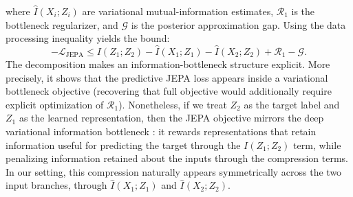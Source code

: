 \documentclass{article}
\begin{document}
where $\widehat I(X_i;Z_i)$ are variational mutual-information estimates, $\mathcal R_1$ is the bottleneck regularizer, and $\mathcal G$ is the posterior approximation gap. Using the data processing inequality yields the bound:
\begin{equation}
-\mathcal L_{\mathrm{JEPA}} \le I(Z_1;Z_2) - \widehat I(X_1;Z_1) - \widehat I(X_2;Z_2) + \mathcal R_1 - \mathcal G.
\label{eq:main_jepa_ib_bound}
\end{equation}
The decomposition makes an information-bottleneck structure explicit. More precisely, it shows that the predictive JEPA loss appears inside a variational bottleneck objective (recovering that full objective would additionally require explicit optimization of $\mathcal R_1$). Nonetheless, if we treat $Z_2$ as the target label and $Z_1$ as the learned representation, then the JEPA objective mirrors the deep variational information bottleneck \citep{alemi2016deepVarIB}: it rewards representations that retain information useful for predicting the target through the $I(Z_1;Z_2)$ term, while penalizing information retained about the inputs through the compression terms. In our setting, this compression naturally appears symmetrically across the two input branches, through $\widehat I(X_1;Z_1)$ and $\widehat I(X_2;Z_2)$.
\end{document}
